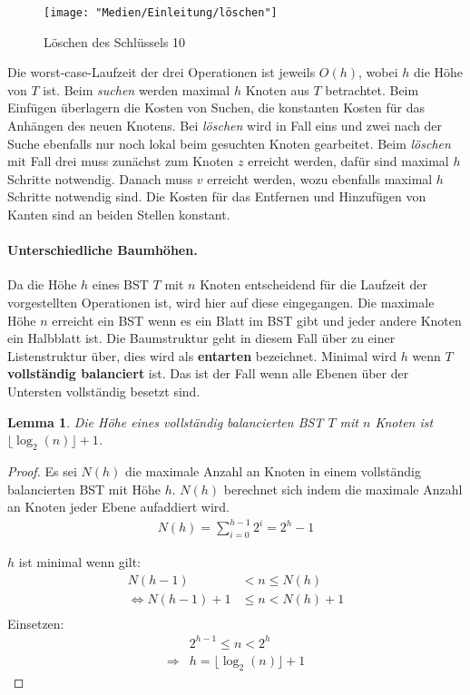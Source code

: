 \documentclass[a4paper,12pt]{article}
\begin{document}
\begin{figure}[h]
	\centering
	\texttt{[image: "Medien/Einleitung/löschen"]}
	\caption{Löschen des Schlüssels 10}
	\label{fig:löschen}
\end{figure}
 \noindent Die worst-case-Laufzeit der drei Operationen ist jeweils $\mathit{O(h)}$, wobei $h$ die Höhe von $T$ ist. Beim \textit{suchen} werden maximal $h$ Knoten aus $T$ betrachtet. Beim Einfügen überlagern die Kosten von Suchen, die konstanten Kosten für das Anhängen des neuen Knotens. Bei \textit{löschen} wird in Fall eins und zwei nach der Suche ebenfalls nur noch lokal beim gesuchten Knoten gearbeitet. Beim \textit{löschen} mit Fall drei muss zunächst zum Knoten $z$ erreicht werden, dafür sind maximal $h$ Schritte notwendig. Danach muss $v$ erreicht werden, wozu ebenfalls maximal $h$ Schritte notwendig sind. Die Kosten für das Entfernen und Hinzufügen von Kanten sind an beiden Stellen konstant.  



\paragraph{Unterschiedliche Baumhöhen.} 
Da die Höhe $h$ eines BST $T$ mit $n$ Knoten entscheidend für die Laufzeit der vorgestellten Operationen ist, wird hier auf diese eingegangen. Die maximale Höhe $n$ erreicht ein BST wenn es ein Blatt im BST gibt und jeder andere Knoten ein Halbblatt ist. Die Baumstruktur geht in diesem Fall über zu einer Listenstruktur über, dies wird als \textbf{entarten} bezeichnet. Minimal wird $h$ wenn $T$ \textbf{vollständig balanciert} ist. Das ist der Fall wenn alle Ebenen über der Untersten vollständig besetzt sind.
\newtheorem{Lemma}{Lemma}[section]
\begin{Lemma} Die Höhe eines vollständig balancierten BST $T$ mit $n$ Knoten ist $ \lfloor \log_2{(n)} \rfloor + 1 $. 
\end{Lemma}
\begin{proof}
	
	Es sei $\mathit{N(h)}$ die maximale Anzahl an Knoten in einem vollständig balancierten BST mit Höhe $h$.
	$\mathit{N(h)}$  berechnet sich indem die maximale Anzahl an Knoten jeder Ebene aufaddiert wird.\\
	\begin{align*}
	 \mathit{N(h)} = \sum\limits_{i=0}^{h-1} 2^i = 2^h - 1 
	\end{align*}
								 
\noindent	$h$ ist minimal wenn gilt:\\
	\begin{align*}
	\mathit{N(h-1)} &< n \leq \mathit{N(h)}\\
	\Leftrightarrow \mathit{N(h-1)} + 1 &\leq n < \mathit{N(h)} + 1\\
	\end{align*}
	Einsetzen:\\
	\begin{align*}
	&2^{h - 1} \leq n < 2^h\\
	\Rightarrow & h =  \lfloor \log_2{(n)} \rfloor + 1
	\end{align*}
	
\end{proof}






\end{document}
